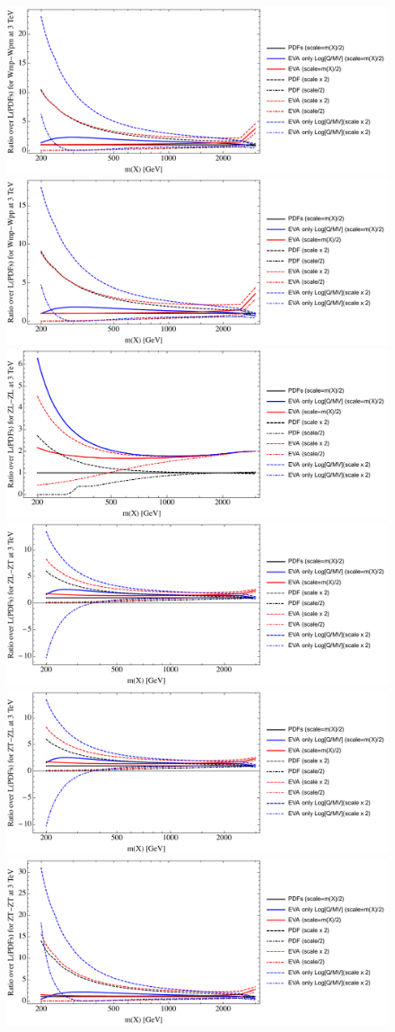 \documentclass[a4paper,11pt]{article}
\begin{document}
\begin{figure}[ht]
\includegraphics[width=0.4\linewidth]{PlotLumi/3TeV/ratios/Wmp-Wpm.pdf}
\includegraphics[width=0.4\linewidth]{PlotLumi/3TeV/ratios/Wmp-Wpp.pdf}
\includegraphics[width=0.4\linewidth]{PlotLumi/3TeV/ratios/ZL-ZL.pdf}
\includegraphics[width=0.4\linewidth]{PlotLumi/3TeV/ratios/ZL-ZT.pdf}
\includegraphics[width=0.4\linewidth]{PlotLumi/3TeV/ratios/ZT-ZL.pdf}
\includegraphics[width=0.4\linewidth]{PlotLumi/3TeV/ratios/ZT-ZT.pdf}
\end{figure}
\end{document}
